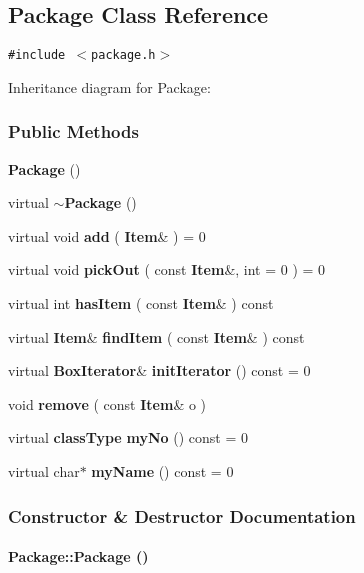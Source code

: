 \subsection{Package  Class Reference}
\label{Package}
{\tt \#include $<$package.h$>$}

Inheritance diagram for Package:\begin{figure}[H]
\begin{center}
\leavevmode
\setlength{\epsfysize}{6cm}
\end{center}
\end{figure}
\subsubsection*{Public Methods}
\begin{CompactItemize}
\item 
{\bf Package} ()
\item 
virtual {\bf $\sim$Package} ()
\item 
virtual void {\bf add} ( {\bf Item}\& ) = 0
\item 
virtual void {\bf pick\-Out} ( const {\bf Item}\&, int = 0 ) = 0
\item 
virtual int {\bf has\-Item} ( const {\bf Item}\& ) const
\item 
virtual {\bf Item}\& {\bf find\-Item} ( const {\bf Item}\& ) const
\item 
virtual {\bf Box\-Iterator}\& {\bf init\-Iterator} () const = 0
\item 
void {\bf remove} ( const {\bf Item}\& o )
\item 
virtual {\bf class\-Type} {\bf my\-No} () const = 0
\item 
virtual char$\ast$ {\bf my\-Name} () const = 0
\end{CompactItemize}


\subsubsection{Constructor \& Destructor Documentation}
\label{Package_a0}
\paragraph{\setlength{\rightskip}{0pt plus 5cm}Package::Package ()\hspace{0.3cm}{\tt  [inline]}}\hfill



